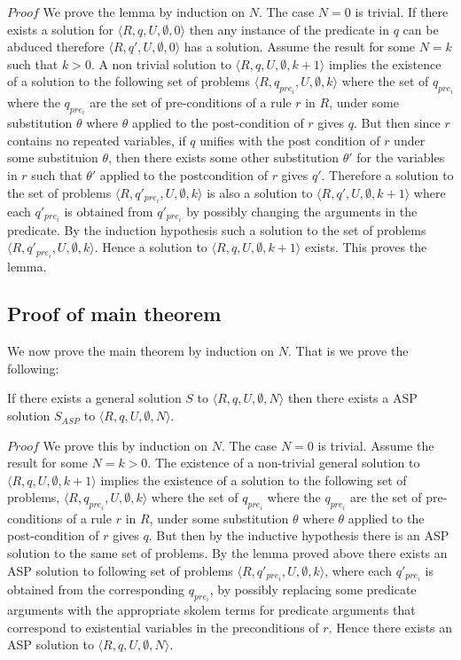 \documentclass[sigconf]{acmart}
\begin{document}
$Proof$ We prove the lemma by induction on $N$.
The case $N = 0$ is trivial. If there exists a solution for $\langle
R,q,U,\emptyset,0\rangle$ then any instance of the predicate in $q$ can be
abduced therefore $\langle R,q',U,\emptyset,0\rangle$ has a solution. Assume
the result for some $N = k$ such that $k>0$. A non trivial solution to
$\langle R,q,U,\emptyset,k+1\rangle$ implies the existence of a solution to
the following set of problems $\langle R,q_{pre_{i}},U,\emptyset,k\rangle$
where the set of $q_{pre_{i}}$ where the $q_{pre_{i}}$ are the set of
pre-conditions of a rule $r$ in $R$, under some substitution $\theta$ where
$\theta$ applied to the post-condition of $r$ gives $q$. But then since $r$
contains no repeated variables, if $q$ unifies with the post condition of $r$
under some substituion $\theta$, then there exists some other substitution
$\theta'$ for the variables in $r$ such that $\theta'$ applied to the
postcondition of $r$ gives $q'$. Therefore a solution to the set of problems
$\langle R,q'_{pre_{i}},U,\emptyset,k\rangle$ is also a solution to $\langle
R,q',U,\emptyset,k+1\rangle$ where each $q'_{pre_{i}}$ is obtained from
$q'_{pre_{i}}$ by possibly changing the arguments in the predicate. By the
induction hypothesis such a solution to the set of problems $\langle
R,q'_{pre_{i}},U,\emptyset,k\rangle$. Hence a solution to  $\langle
R,q,U,\emptyset,k+1\rangle$ exists. This proves the lemma.

\subsection{Proof of main theorem}
We now prove the main theorem by induction on $N$. That is we prove the following:

\begin{theorem}[Completeness]\label{thm:completeness}
  If there exists a general solution $S$ to $\langle R,q,U,\emptyset,N\rangle$ then there
  exists a ASP solution $S_{ASP}$ to $\langle R,q,U,\emptyset,N\rangle$.
\end{theorem}

$Proof$ We prove this by induction on $N$. The case $N=0$ is trivial. Assume
the result for some $N=k>0$. The existence of a non-trivial general solution
to $\langle R,q,U,\emptyset,k+1\rangle$ implies the existence of a solution to
the following set of problems, $\langle R,q_{pre_{i}},U,\emptyset,k\rangle$
where the set of $q_{pre_{i}}$ where the $q_{pre_{i}}$ are the set of
pre-conditions of a rule $r$ in $R$, under some substitution $\theta$ where
$\theta$ applied to the post-condition of $r$ gives $q$. But then by the
inductive hypothesis there is an ASP solution to the same set of problems. By
the lemma proved above there exists an ASP solution to following set of
problems $\langle R,q'_{pre_{i}},U,\emptyset,k\rangle$, where each
$q'_{pre_{i}}$ is obtained from the corresponding $q_{pre_{i}}$, by possibly
replacing some predicate arguments with the appropriate skolem terms for
predicate arguments that correspond to existential variables in the
preconditions of $r$. Hence there exists an ASP solution to
$\langle R,q,U,\emptyset,N\rangle$.
\end{document}
